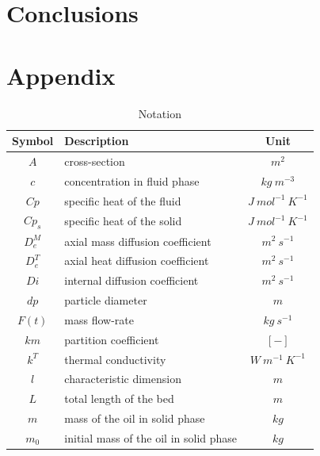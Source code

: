 \documentclass[a4paper,fleqn]{cas-dc}
\begin{document}
\section{Conclusions}

\clearpage
%



\clearpage \appendix \label{appendix}
\section{Appendix} 

\newpage
\begin{table}[p]
		\caption{Notation}
		\label{tab::symbols}
		\begin{tabular}{ |c|l|c| } 
			\hline
			Symbol 		& 	Description 							& Unit 						\\ \hline
			$A$			&	cross-section							& $m^2$ 					\\ \hline
			$c$			&	concentration in fluid phase			& $kg ~ m^{-3}$				\\ \hline
			$Cp$		&	specific heat of the fluid				& $J ~ mol^{-1} ~ K^{-1}$ 	\\ \hline
			$Cp_s$		&	specific heat of the solid				& $J ~ mol^{-1} ~ K^{-1}$ 	\\ \hline
			$D_e^M$		&	axial mass diffusion coefficient		& $m^2 ~ s^{-1}$			\\ \hline
			$D_e^T$		&	axial heat diffusion coefficient		& $m^2 ~ s^{-1}$			\\ \hline
			$Di$		&	internal diffusion coefficient			& $m^2 ~ s^{-1}$			\\ \hline
			$dp$		&	particle diameter						& $m$						\\ \hline
			$F(t)$		&	mass flow-rate							& $kg ~ s^{-1}$				\\ \hline
			$km$		&	partition coefficient					& $[-]$						\\ \hline
			$k^T$		&	thermal conductivity					& $W ~ m^{-1} ~ K^{-1}$		\\ \hline
			$l$			&	characteristic dimension				& $m$						\\ \hline
			$L$			&	total length of the bed					& $m$						\\ \hline
			$m$			&	mass of the oil in solid phase			& $kg$						\\ \hline
			$m_0$		&	initial mass of the oil in solid phase	& $kg$						\\ \hline

\end{tabular}
\end{table}
\end{document}
